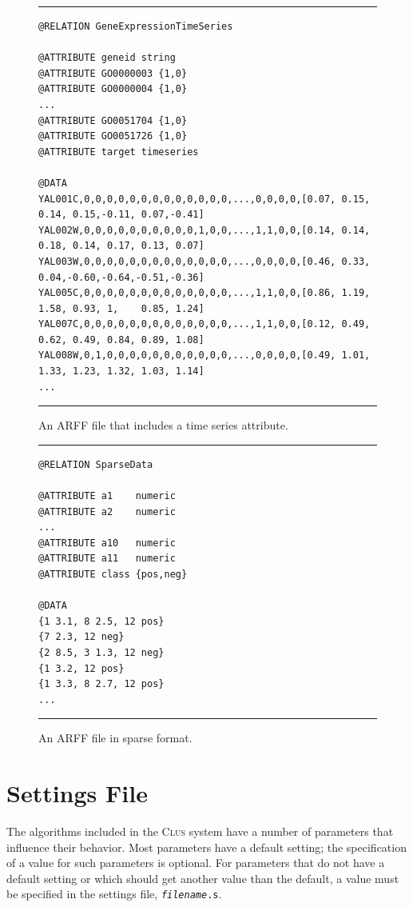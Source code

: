 \documentclass[a4paper]{report}
\newcommand{\clus}{\textsc{Clus}}
\begin{document}
\begin{figure}[tb]
\hrule\vspace{1em}
\begin{verbatim}
@RELATION GeneExpressionTimeSeries

@ATTRIBUTE geneid string
@ATTRIBUTE GO0000003 {1,0}
@ATTRIBUTE GO0000004 {1,0}
...
@ATTRIBUTE GO0051704 {1,0}
@ATTRIBUTE GO0051726 {1,0}
@ATTRIBUTE target timeseries

@DATA
YAL001C,0,0,0,0,0,0,0,0,0,0,0,0,0,...,0,0,0,0,[0.07, 0.15, 0.14, 0.15,-0.11, 0.07,-0.41]
YAL002W,0,0,0,0,0,0,0,0,0,0,1,0,0,...,1,1,0,0,[0.14, 0.14, 0.18, 0.14, 0.17, 0.13, 0.07]
YAL003W,0,0,0,0,0,0,0,0,0,0,0,0,0,...,0,0,0,0,[0.46, 0.33, 0.04,-0.60,-0.64,-0.51,-0.36]
YAL005C,0,0,0,0,0,0,0,0,0,0,0,0,0,...,1,1,0,0,[0.86, 1.19, 1.58, 0.93, 1,    0.85, 1.24]
YAL007C,0,0,0,0,0,0,0,0,0,0,0,0,0,...,1,1,0,0,[0.12, 0.49, 0.62, 0.49, 0.84, 0.89, 1.08]
YAL008W,0,1,0,0,0,0,0,0,0,0,0,0,0,...,0,0,0,0,[0.49, 1.01, 1.33, 1.23, 1.32, 1.03, 1.14]
...
\end{verbatim}
\hrule
\caption{An ARFF file that includes a time series attribute.}
\label{arfftimeser:fig}
\end{figure}

\begin{figure}[tb]
\hrule\vspace{1em}
\begin{verbatim}
@RELATION SparseData

@ATTRIBUTE a1    numeric
@ATTRIBUTE a2    numeric
...
@ATTRIBUTE a10   numeric
@ATTRIBUTE a11   numeric
@ATTRIBUTE class {pos,neg}

@DATA
{1 3.1, 8 2.5, 12 pos}
{7 2.3, 12 neg}
{2 8.5, 3 1.3, 12 neg}
{1 3.2, 12 pos}
{1 3.3, 8 2.7, 12 pos}
...
\end{verbatim}
\hrule
\caption{An ARFF file in sparse format.}
\label{arffsparse:fig}
\end{figure}

%
\chapter{Settings File}
\label{ch:sett}

The algorithms included in the \clus{} system have a number of parameters that influence their behavior.  Most parameters have a default setting; the specification of a value for such parameters is optional.  For parameters that do not have a default setting or which should get another value than the default, a value must be specified in the settings file, {\tt {\em filename}.s}.
\end{document}

